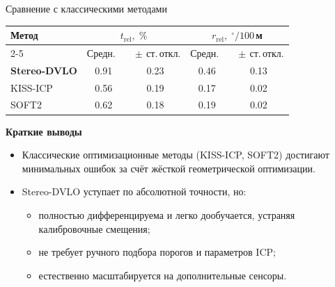 \documentclass{beamer} %
\begin{document}
\begin{frame}{Сравнение с классическими методами}
  \footnotesize
  \begin{center}
    \begin{tabular}{|l|c|c|c|c|}
      \hline
      \multirow{2}{*}{Метод} &
      \multicolumn{2}{c|}{$t_{\mathrm{rel}},\;\%$} &
      \multicolumn{2}{c|}{$r_{\mathrm{rel}},\;^{\circ}/100$\,м} \\ \cline{2-5}
      & Средн.\ & $\;\pm$\,ст.\,откл.& Средн.\ & $\;\pm$\,ст.\,откл. \\ \hline
      \textbf{Stereo-DVLO} & 0.91 & 0.23 & 0.46 & 0.13 \\
      KISS-ICP            & 0.56 & 0.19 & 0.17 & 0.02 \\
      SOFT2               & 0.62 & 0.18 & 0.19 & 0.02 \\ \hline
    \end{tabular}
  \end{center}

  \vspace{6pt}
  \textbf{Краткие выводы}
  \begin{itemize}
      \item Классические оптимизационные методы (KISS-ICP, SOFT2) достигают
            минимальных ошибок за счёт жёсткой геометрической оптимизации.
      \item Stereo-DVLO уступает по абсолютной точности, но:
            \begin{itemize}
                \item полностью дифференцируема и легко дообучается,
                      устраняя калибровочные смещения;
                \item не требует ручного подбора порогов и параметров ICP;
                \item естественно масштабируется на дополнительные сенсоры.
            \end{itemize}
  \end{itemize}
\end{frame}
\end{document}
